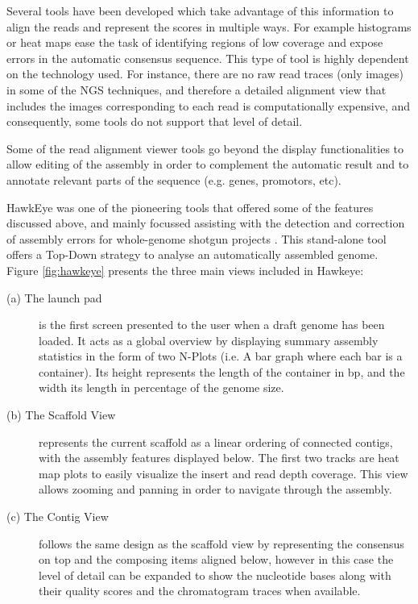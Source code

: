 Several tools have been developed which take advantage of this information to align the reads and represent the scores in multiple ways. For example histograms or heat maps ease the task of identifying regions of low coverage and expose errors in the automatic consensus sequence. This type of tool is highly dependent on the technology used. For instance, there are no raw read traces (only images) in some of the NGS techniques, and therefore a detailed alignment view that includes the images corresponding to each read is computationally expensive, and consequently, some tools do not support that level of detail. 

Some of the read alignment viewer tools go beyond the display functionalities to allow editing of the assembly in order to complement the automatic result and to annotate relevant parts of the sequence (e.g. genes, promotors, etc).

HawkEye was one of the pioneering tools that offered some of the features discussed above, and mainly focussed assisting with the detection and correction of assembly errors for whole-genome shotgun projects \cite{SCH2007}. This stand-alone tool offers a Top-Down strategy to analyse an automatically assembled genome. Figure \ref{fig:hawkeye} presents the three main views included in Hawkeye: 

\begin{description}
\item[(a) The launch pad] is the first screen presented to the user when a draft genome has been loaded. It acts as a global overview by displaying summary assembly statistics in the form of two N-Plots (i.e. A bar graph where each bar is a container). Its height represents the length of the container in bp, and the width its length in percentage of the genome size.
\item[(b) The Scaffold View] represents the current scaffold as a linear ordering of connected contigs, with the assembly features displayed below. The first two tracks are heat map plots to easily visualize the insert and read depth coverage. This view allows zooming and panning in order to navigate through the assembly.
\item[(c) The Contig View] follows the same design as the scaffold view by representing the consensus on top and the composing items aligned below, however in this case the level of detail can be expanded to show the nucleotide bases along with their quality scores and the chromatogram traces when available.
\end{description}

